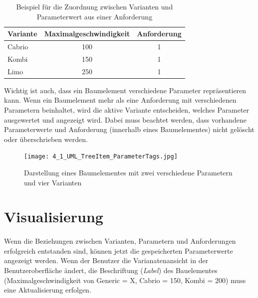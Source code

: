 \begin{table}[h]
\begin{center}
	\begin{tabular}{|l||c|c|}
	 \hline
	 Variante &Maximalgeschwindigkeit &Anforderung\\
	 \hline\hline
	 Cabrio   &100                      & 1\\
	 \hline
	 Kombi    &150                      & 1\\
	 \hline
	 Limo     &250                      & 1\\
	 \hline
	\end{tabular}
	
	\caption{Beispiel für die Zuordnung zwischen Varianten und Parameterwert aus einer Anforderung}
	\label{table:4TestCases}
\end{center}
\end{table}

Wichtig ist auch, dass ein Baumelement verschiedene Parameter repräsentieren kann. Wenn ein Baumelement mehr als eine Anforderung mit verschiedenen Parametern beinhaltet, wird die aktive Variante entscheiden, welches Parameter ausgewertet  und angezeigt wird. Dabei muss beachtet werden, dass vorhandene Parameterwerte und Anforderung (innerhalb eines Baumelementes) nicht gelöscht oder überschrieben werden.\\

\begin{figure}[h!]
  \begin{center}
    \texttt{[image: 4\_1\_UML\_TreeItem\_ParameterTags.jpg]}
  		  \caption{Darstellung eines Baumelementes mit zwei verschiedene Parametern und vier Varianten}
     \label{ttn.treeitem_vars}
  \end{center}
\end{figure}

\newpage
\section{Visualisierung}\label{sec.visialisierung}
\paragraph{}

Wenn die Beziehungen zwischen Varianten, Parametern und Anforderungen erfolgreich entstanden sind, können jetzt die gespeicherten Parameterwerte angezeigt werden. Wenn der Benutzer die Varianatenansicht in der Benutzeroberfläche ändert, die Beschriftung (\textit{Label}) des Bauelementes (Maximalgeschwindigkeit von Generic = X, Cabrio = 150, Kombi = 200) muss eine Aktualisierung erfolgen.


